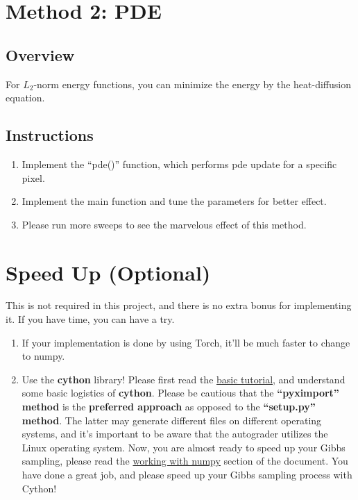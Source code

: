 \documentclass[11pt]{article}
\begin{document}
\section{Method 2: PDE}

\subsection{Overview}

 For $L_2$-norm energy functions, you can minimize the energy by the heat-diffusion equation. 
 \subsection{Instructions}
 \begin{enumerate}
     \item Implement the ``pde()'' function, which performs pde update for a specific pixel. 
     \item Implement the main function and tune the parameters for better effect. 
     \item Please run more sweeps to see the marvelous effect of this method.
 \end{enumerate}
 
\section{Speed Up (Optional)}

This is not required in this project, and there is no extra bonus for implementing it. If you have time, you can have a try.
\begin{enumerate}
    \item If your implementation is done by using Torch, it'll be much faster to change to numpy.
    \item Use the \textbf{cython} library! Please first read the \href{https://cython.readthedocs.io/en/latest/src/tutorial/cython_tutorial.html}{basic tutorial}, and understand some basic logistics of \textbf{cython}. Please be cautious that the \textbf{``pyximport'' method} is the \textbf{preferred approach} as opposed to the \textbf{``setup.py'' method}. The latter may generate different files on different operating systems, and it's important to be aware that the autograder utilizes the Linux operating system. Now, you are almost ready to speed up your Gibbs sampling, please read the \href{https://cython.readthedocs.io/en/latest/src/tutorial/numpy.html}{working with numpy} section of the document. You have done a great job, and please speed up your Gibbs sampling process with Cython!
\end{enumerate}
\end{document}

